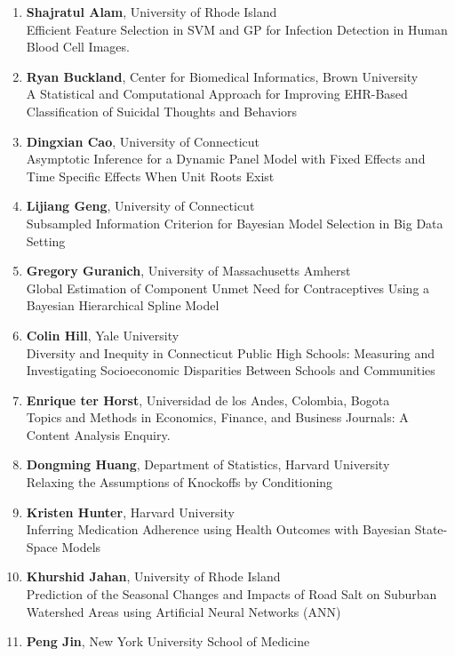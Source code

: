 
\begin{enumerate}
\item \textbf{Shajratul Alam}, University of Rhode Island \\
Efficient Feature Selection in SVM and GP for Infection Detection in Human Blood Cell Images.
\item \textbf{Ryan Buckland}, Center for Biomedical Informatics, Brown University \\
A Statistical and Computational Approach for Improving EHR-Based Classification of Suicidal Thoughts and Behaviors
\item \textbf{Dingxian Cao}, University of Connecticut \\
Asymptotic Inference for a Dynamic Panel Model with Fixed Effects and Time Specific Effects When Unit Roots Exist
\item \textbf{Lijiang Geng}, University of Connecticut \\
Subsampled Information Criterion for Bayesian Model Selection in Big Data Setting
\item \textbf{Gregory Guranich}, University of Massachusetts Amherst \\
Global Estimation of Component Unmet Need for Contraceptives Using a Bayesian Hierarchical Spline Model
\item \textbf{Colin Hill}, Yale University \\
Diversity and Inequity in Connecticut Public High Schools: Measuring and Investigating Socioeconomic Disparities Between Schools and Communities
\item \textbf{Enrique ter Horst}, Universidad de los Andes, Colombia, Bogota \\
Topics and Methods in Economics, Finance, and Business Journals: A Content Analysis Enquiry.
\item \textbf{Dongming Huang}, Department of Statistics, Harvard University \\
Relaxing the Assumptions of Knockoffs by Conditioning
\item \textbf{Kristen Hunter}, Harvard University \\
Inferring Medication Adherence using Health Outcomes with Bayesian State-Space Models
\item \textbf{Khurshid Jahan}, University of Rhode Island \\
Prediction of the Seasonal Changes and Impacts of Road Salt on Suburban Watershed Areas using Artificial Neural Networks (ANN)
\item \textbf{Peng Jin}, New York University School of Medicine \\

\end{enumerate}
